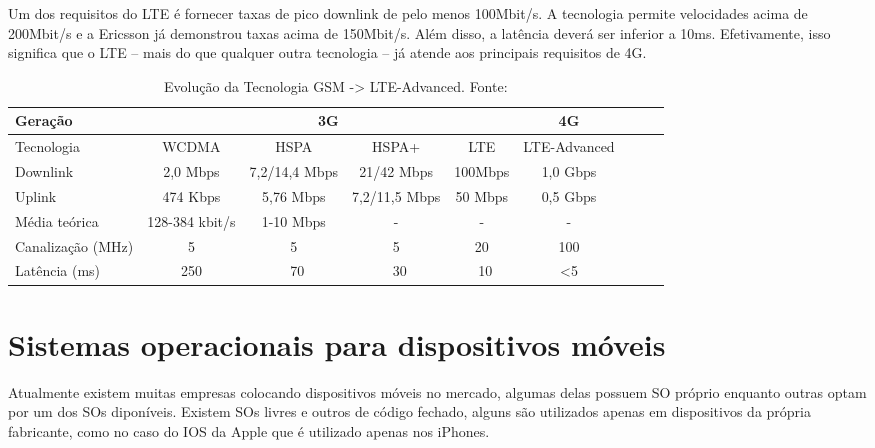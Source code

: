 \begin{citacao}
Um dos requisitos do LTE é fornecer taxas de pico downlink de pelo menos 100Mbit/s. A tecnologia permite velocidades acima de 200Mbit/s e a Ericsson já demonstrou taxas acima de 150Mbit/s. Além disso, a latência  deverá ser inferior a 10ms. Efetivamente, isso significa que o LTE – mais do que qualquer outra tecnologia – já atende aos principais requisitos de 4G. \cite{teleco09}
\end{citacao}

\begin{table}[!htb]
	\footnotesize
  	\centering
	\caption[Evolução da Tecnologia GSM -> LTE-Advanced]{Evolução da Tecnologia GSM -> LTE-Advanced. Fonte: \cite{4gamericas}}
	\begin{tabular}{|l|*{8}{c|}}
		\hline \SPACE
		Geração & \multicolumn{4}{|c|}{3G}  & 4G\\ \hline \SPACE
		Tecnologia & WCDMA & HSPA & HSPA+ & LTE & LTE-Advanced\\ \hline \SPACE
		Downlink & 2,0 Mbps & 7,2/14,4 Mbps & 21/42 Mbps & 100Mbps & 1,0 Gbps\\ \hline \SPACE
		Uplink & 474 Kbps & 5,76 Mbps & 7,2/11,5 Mbps & 50 Mbps & 0,5 Gbps\\ \hline \SPACE
		Média teórica & 128-384 kbit/s & 1-10 Mbps & - & - & -\\ \hline \SPACE
		Canalização (MHz) & 5 & 5 & 5 & 20 & 100\\ \hline \SPACE
		Latência (ms) & 250 & ~70 & ~30 & ~10 & <5\\ \hline
	\end{tabular}
	\label{tab:LTE}
\end{table}%

\section{Sistemas operacionais para dispositivos móveis}
Atualmente existem muitas empresas colocando dispositivos móveis no mercado, algumas delas possuem SO próprio enquanto outras optam por um dos SOs diponíveis.
Existem SOs livres e outros de código fechado, alguns são utilizados apenas em dispositivos da própria fabricante, como no caso do IOS da Apple que é utilizado apenas nos iPhones.


